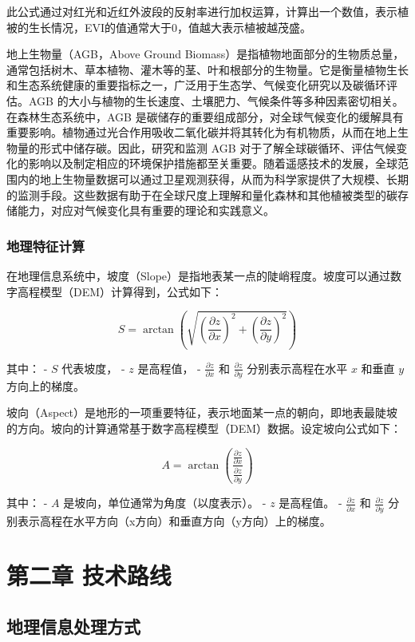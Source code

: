 \documentclass{article}
\begin{document}
		此公式通过对红光和近红外波段的反射率进行加权运算，计算出一个数值，表示植被的生长情况，EVI的值通常大于0，值越大表示植被越茂盛。
		\par
		地上生物量（AGB，Above Ground Biomass）是指植物地面部分的生物质总量，通常包括树木、草本植物、灌木等的茎、叶和根部分的生物量。它是衡量植物生长和生态系统健康的重要指标之一，广泛用于生态学、气候变化研究以及碳循环评估。AGB 的大小与植物的生长速度、土壤肥力、气候条件等多种因素密切相关。在森林生态系统中，AGB 是碳储存的重要组成部分，对全球气候变化的缓解具有重要影响。植物通过光合作用吸收二氧化碳并将其转化为有机物质，从而在地上生物量的形式中储存碳。因此，研究和监测 AGB 对于了解全球碳循环、评估气候变化的影响以及制定相应的环境保护措施都至关重要。随着遥感技术的发展，全球范围内的地上生物量数据可以通过卫星观测获得，从而为科学家提供了大规模、长期的监测手段。这些数据有助于在全球尺度上理解和量化森林和其他植被类型的碳存储能力，对应对气候变化具有重要的理论和实践意义。
		\subsubsection{地理特征计算}
		
		在地理信息系统中，坡度（Slope）是指地表某一点的陡峭程度。坡度可以通过数字高程模型（DEM）计算得到，公式如下：
		
		\[
		S = \arctan \left( \sqrt{ \left( \frac{\partial z}{\partial x} \right)^2 + \left( \frac{\partial z}{\partial y} \right)^2 } \right)
		\]
		
		其中：
		- \( S \) 代表坡度，
		- \( z \) 是高程值，
		- \( \frac{\partial z}{\partial x} \) 和 \( \frac{\partial z}{\partial y} \) 分别表示高程在水平 \( x \) 和垂直 \( y \) 方向上的梯度。

		
		坡向（Aspect）是地形的一项重要特征，表示地面某一点的朝向，即地表最陡坡的方向。坡向的计算通常基于数字高程模型（DEM）数据。设定坡向公式如下：
		
		\[
		A = \arctan \left( \frac{ \frac{\partial z}{\partial x} }{ \frac{\partial z}{\partial y} } \right)
		\]
		
		其中：
		- \( A \) 是坡向，单位通常为角度（以度表示）。
		- \( z \) 是高程值。
		- \( \frac{\partial z}{\partial x} \) 和 \( \frac{\partial z}{\partial y} \) 分别表示高程在水平方向（x方向）和垂直方向（y方向）上的梯度。
		
		
	\section{第二章 技术路线}
	
	
	\subsection{地理信息处理方式}
\end{document}
